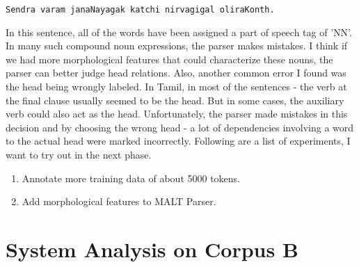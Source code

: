 \documentclass[11pt,letterpaper]{article}
\begin{document}
\begin{verbatim}
Sendra varam janaNayagak katchi nirvagigal oliraKonth. 
\end{verbatim}

In this sentence, all of the words have been assigned a part of speech tag of 'NN'. In many such compound noun expressions, the parser makes mistakes.
I think if we had more morphological features that could characterize these nouns, the parser can better judge head relations. Also, another common error
I found was the head being wrongly labeled. In Tamil, in most of the sentences - the verb at the final clause usually seemed to be the head. But in
some cases, the auxiliary verb could also act as the head. Unfortunately, the parser made mistakes in this decision and by choosing the wrong head - a lot of
dependencies involving a word to the actual head were marked incorrectly. Following are a list of experiments, I want to try out in the next phase.

\begin{enumerate}
  \item Annotate more training data of about 5000 tokens.
  \item Add morphological features to MALT Parser.     
\end{enumerate}

\section{System Analysis on Corpus B}
\end{document}
